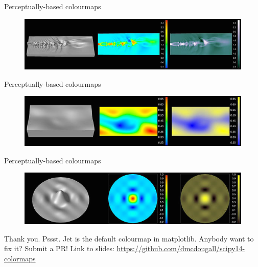 \documentclass[10pt,presentation,compress]{beamer}
\begin{document}
\begin{frame}{Perceptually-based colourmaps}
  \begin{figure}[htp]
    \includegraphics[scale=0.55]{pjetnoise.png}
  \end{figure}
\end{frame}

\begin{frame}{Perceptually-based colourmaps}
  \begin{figure}[htp]
    \includegraphics[scale=0.55]{pmagfield.png}
  \end{figure}
\end{frame}

\begin{frame}{Perceptually-based colourmaps}
  \begin{figure}[htp]
    \includegraphics[scale=0.55]{psinc.png}
  \end{figure}
\end{frame}

\begin{frame}
  \begin{center}
    Thank you.
    \linebreak
    \linebreak
    Pssst.  Jet is the default colourmap in matplotlib.  Anybody want to fix it?  Submit a PR!
    \linebreak
    \linebreak
    Link to slides:  \url{https://github.com/dmcdougall/scipy14-colormaps}
  \end{center}
\end{frame}
\end{document}
